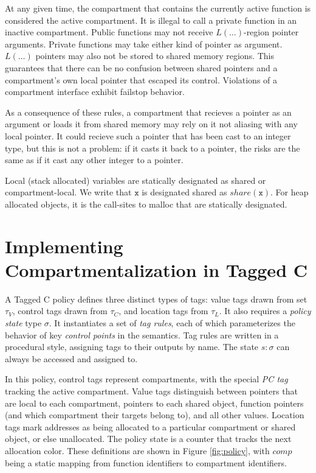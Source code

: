\documentclass{article}
\begin{document}
At any given time, the compartment that contains the currently active function is
considered the active compartment. It is illegal to call a private function in an
inactive compartment. Public functions may not receive \(L(\dots)\)-region pointer arguments.
Private functions may take either kind of pointer as argument. \(L(\dots)\) pointers
may also not be stored to shared memory regions. This guarantees that there can be no
confusion between shared pointers and a compartment's own local pointer that
escaped its control. Violations of a compartment interface exhibit failstop behavior.

As a consequence of these rules, a compartment that recieves a pointer as an argument
or loads it from shared memory may rely on it not aliasing with any local pointer.
It could recieve such a pointer that has been cast to an integer type, but this is
not a problem: if it casts it back to a pointer, the risks are the same as if it
cast any other integer to a pointer.

Local (stack allocated) variables are statically designated as shared or compartment-local.
We write that \(\mathtt{x}\) is designated shared as \(\mathit{share}(\mathtt{x})\).
For heap allocated objects, it is the call-sites to malloc that are statically designated.

\section{Implementing Compartmentalization in Tagged C}

A Tagged C policy defines three distinct types of tags: value tags 
drawn from set \(\tau_V\), control tags drawn from \(\tau_C\), and location tags
from \(\tau_L\). It also requires a {\it policy state} type \(\sigma\).
It instantiates a set of {\it tag rules}, each of which parameterizes the behavior
of key {\it control points} in the semantics. Tag rules are written in a procedural style,
assigning tags to their outputs by name. The state \(s : \sigma\) can always be accessed
and assigned to.

In this policy, control tags represent compartments, with the special {\it PC tag}
tracking the active compartment. Value tags distinguish between pointers that are local
to each compartment, pointers to each shared object, function pointers
(and which compartment their targets belong to), and all other values.
Location tags mark addresses as being allocated to a particular compartment or shared object, or
else unallocated. The policy state is a counter that tracks the next allocation color.
These definitions are shown in Figure \ref{fig:policy}, with \(\mathit{comp}\) being a
static mapping from function identifiers to compartment identifiers.
\end{document}
